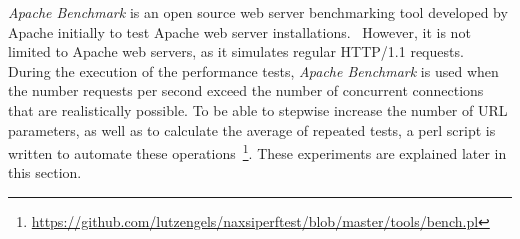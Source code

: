 \emph{Apache Benchmark} is an open source web server benchmarking tool developed by Apache initially to test Apache web server installations.~\cite{apachebenchmark2013} However, it is not limited to Apache web servers, as it simulates regular HTTP/1.1 requests.\\
During the execution of the performance tests, \emph{Apache Benchmark} is used when the number requests per second exceed the number of concurrent connections that are realistically possible. To be able to stepwise increase the number of URL parameters, as well as to calculate the average of repeated tests, a perl script is written to automate these operations~\footnote{\url{https://github.com/lutzengels/naxsiperftest/blob/master/tools/bench.pl}}.  These experiments are explained later in this section.
